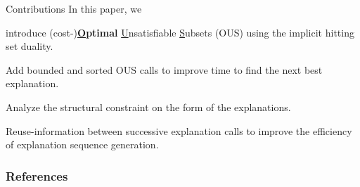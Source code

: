 \documentclass{beamer}
\begin{document}

	
	\begin{frame}{Contributions}
		In this paper, we
			\begin{description}[font=\color{vuborange}\itshape]
			\item[Optimality] introduce (cost-)\textbf{\underline{O}ptimal} \underline{U}nsatisfiable \underline{S}ubsets (OUS) using the implicit hitting set duality.
			\item[Efficiency] Add bounded and sorted OUS calls to improve time to find the next best explanation.
			\item[Constrainedness] Analyze the structural constraint on the form of the explanations.
			\item[Incrementality] Reuse-information between successive explanation calls to improve the efficiency of explanation sequence generation.
		\end{description}
		\vfill
	\end{frame}
	
	\begin{frame}[allowframebreaks]
		\frametitle{References}
		
		
	\end{frame}
\end{document}
